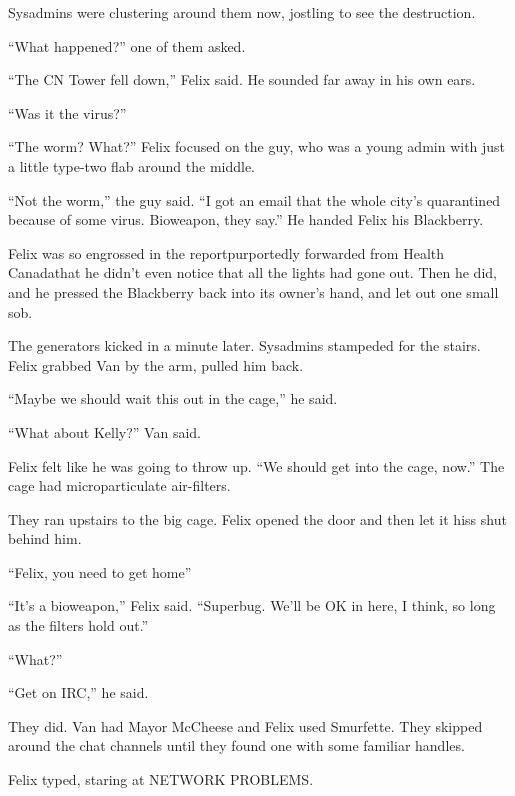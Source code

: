 Sysadmins were clustering around them now, jostling to see the
destruction.

“What happened?” one of them asked.

“The CN Tower fell down,” Felix said. He sounded far away in his
own ears.

“Was it the virus?”

“The worm? What?” Felix focused on the guy, who was a young admin
with just a little type-two flab around the middle.

“Not the worm,” the guy said. “I got an email that the whole city’s
quarantined because of some virus. Bioweapon, they say.” He handed
Felix his Blackberry.

Felix was so engrossed in the report\dash{}purportedly forwarded from
Health Canada\dash{}that he didn’t even notice that all the lights had
gone out. Then he did, and he pressed the Blackberry back into its
owner’s hand, and let out one small sob.

\tb

The generators kicked in a minute later. Sysadmins stampeded for
the stairs. Felix grabbed Van by the arm, pulled him back.

“Maybe we should wait this out in the cage,” he said.

“What about Kelly?” Van said.

Felix felt like he was going to throw up. “We should get into the
cage, now.” The cage had microparticulate air-filters.

They ran upstairs to the big cage. Felix opened the door and then
let it hiss shut behind him.

“Felix, you need to get home\dash{}”

“It’s a bioweapon,” Felix said. “Superbug. We’ll be OK in here, I
think, so long as the filters hold out.”

“What?”

“Get on IRC,” he said.

They did. Van had Mayor McCheese and Felix used Smurfette. They
skipped around the chat channels until they found one with some
familiar handles.

Felix typed, staring at NETWORK PROBLEMS.

